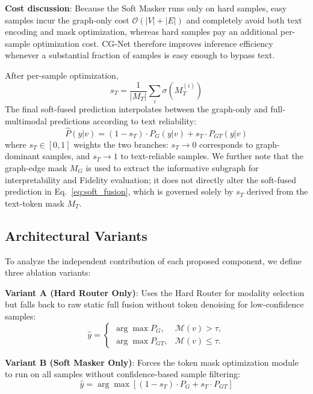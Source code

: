 \documentclass[preprint,12pt,authoryear]{elsarticle}
\begin{document}
\noindent\textbf{Cost discussion}: Because the Soft Masker runs only on hard samples, easy samples incur the graph-only cost $\mathcal{O}(|V|+|E|)$ and completely avoid both text encoding and mask optimization, whereas hard samples pay an additional per-sample optimization cost. CG-Net therefore improves inference efficiency whenever a substantial fraction of samples is easy enough to bypass text.

After per-sample optimization,
\begin{equation}
    s_T = \frac{1}{|M_T|} \sum_{i} \sigma(M_T^{(i)})
    \label{eq:text_score}
\end{equation}
The final soft-fused prediction interpolates between the graph-only and full-multimodal predictions according to text reliability:
\begin{equation}
    \hat{P}(y|v) = (1 - s_T) \cdot P_G(y|v) + s_T \cdot P_{GT}(y|v)
    \label{eq:soft_fusion}
\end{equation}
where $s_T \in [0,1]$ weights the two branches: $s_T \to 0$ corresponds to graph-dominant samples, and $s_T \to 1$ to text-reliable samples.
We further note that the graph-edge mask $M_G$ is used to extract the informative subgraph for interpretability and Fidelity evaluation; it does not directly alter the soft-fused prediction in Eq.~\eqref{eq:soft_fusion}, which is governed solely by $s_T$ derived from the text-token mask $M_T$.

\subsection{Architectural Variants}
To analyze the independent contribution of each proposed component, we define three ablation variants:

\noindent\textbf{Variant A (Hard Router Only)}: Uses the Hard Router for modality selection but falls back to raw static full fusion without token denoising for low-confidence samples:
\begin{equation}
\hat{y} =
\begin{cases}
\arg\max P_G, & \mathcal{M}(v) > \tau, \\
\arg\max P_{GT}, & \mathcal{M}(v) \le \tau.
\end{cases}
\label{eq:variant_a}
\end{equation}

\noindent\textbf{Variant B (Soft Masker Only)}: Forces the token mask optimization module to run on all samples without confidence-based sample filtering:
\begin{equation}
    \hat{y} = \arg\max \left[ (1 - s_T) \cdot P_G + s_T \cdot P_{GT} \right]
    \label{eq:variant_b}
\end{equation}
\end{document}
